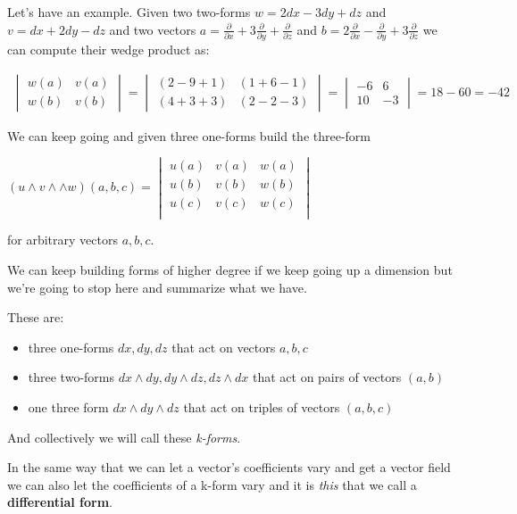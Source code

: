 \documentclass{article}
\theoremstyle{definition}
\begin{document}
Let's have an example. Given two two-forms $w = 2dx - 3dy + dz$ and $v = dx +
2dy - dz$ and two vectors $a = \frac{\partial}{\partial x} +
3\frac{\partial}{\partial y} + \frac{\partial}{\partial z}$ and $b =
2\frac{\partial}{\partial x} - \frac{\partial}{\partial y} +
3\frac{\partial}{\partial z}$ we can compute their wedge product as:

\begin{align*}
  \begin{vmatrix}
    w (a) & v(a) \\
    w (b) & v(b)
  \end{vmatrix} =
  \begin{vmatrix}
    (2 - 9 + 1) & (1 + 6 - 1) \\
    (4 + 3 + 3) & (2 - 2 -3)
  \end{vmatrix} =
  \begin{vmatrix}
    -6 & 6 \\
    10 & -3 
  \end{vmatrix} = 18 - 60 = -42
\end{align*}

We can keep going and given three one-forms build the three-form

$
(u \wedge v \wedge \wedge w) (a, b, c) =
\begin{vmatrix}
  u (a) & v (a) & w (a) \\
  u (b) & v (b) & w (b) \\
  u (c) & v (c) & w (c) \\
\end{vmatrix}
$

for arbitrary vectors $a, b, c$.

We can keep building forms of higher degree if we keep going up a dimension but
we're going to stop here and summarize what we have.

These are:

\begin{itemize}
  \item three one-forms $dx, dy, dz$ that act on vectors $a, b, c$
  \item three two-forms $dx \wedge dy, dy \wedge dz, dz \wedge dx$ that act on
    pairs of vectors $(a, b)$
  \item one three form $dx \wedge dy \wedge dz$ that act on triples of vectors
    $(a, b, c)$
\end{itemize}

And collectively we will call these \textit{k-forms}.

In the same way that we can let a vector's coefficients vary and get a vector
field we can also let the coefficients of a k-form vary and
it is \textit{this} that we call a \textbf{differential form}.
\end{document}
